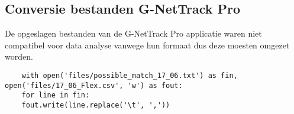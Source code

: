 \subsection{Conversie bestanden G-NetTrack Pro}

De opgeslagen bestanden van de G-NetTrack Pro applicatie waren niet compatibel voor data analyse vanwege hun formaat dus deze moesten omgezet worden.

\begin{verbatim}
    with open('files/possible_match_17_06.txt') as fin, open('files/17_06_Flex.csv', 'w') as fout:
    for line in fin:
    fout.write(line.replace('\t', ','))
\end{verbatim}